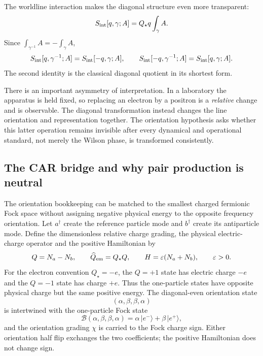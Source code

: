 \documentclass[11pt]{article}
\theoremstyle{definition}\newtheorem{definition}[theorem]{Definition}
\theoremstyle{remark}\newtheorem{remark}[theorem]{Remark}\newtheorem{conjecture}[theorem]{Conjecture}
\begin{document}
The worldline interaction makes the diagonal structure even more transparent:
\begin{equation}\label{eq:worldint}
 S_{\rm int}[q,\gamma;A]=Q_\star q\int_\gamma A.
\end{equation}
Since $\int_{\gamma^{-1}}A=-\int_\gamma A$,
\begin{equation}\label{eq:worlddiag}
 S_{\rm int}[q,\gamma^{-1};A]=S_{\rm int}[-q,\gamma;A],
 \qquad
 S_{\rm int}[-q,\gamma^{-1};A]=S_{\rm int}[q,\gamma;A].
\end{equation}
The second identity is the classical diagonal quotient in its shortest form.

There is an important asymmetry of interpretation. In a laboratory the apparatus is held fixed, so replacing an electron by a positron is a \emph{relative} change and is observable. The diagonal transformation instead changes the line orientation and representation together. The orientation hypothesis asks whether this latter operation remains invisible after every dynamical and operational standard, not merely the Wilson phase, is transformed consistently.

\subsection{The CAR bridge and why pair production is neutral}
The orientation bookkeeping can be matched to the smallest charged fermionic Fock space without assigning negative physical energy to the opposite frequency orientation. Let $a^\dagger$ create the reference particle mode and $b^\dagger$ create its antiparticle mode. Define the dimensionless relative charge grading, the physical electric-charge operator and the positive Hamiltonian by
\begin{equation}\label{eq:CARQH}
 Q=N_a-N_b,\qquad
 \widehat Q_{\rm em}=Q_\star Q,\qquad
 H=\varepsilon(N_a+N_b),\qquad \varepsilon>0.
\end{equation}
For the electron convention $Q_\star=-e$, the $Q=+1$ state has electric charge $-e$ and the $Q=-1$ state has charge $+e$. Thus the one-particle states have opposite physical charge but the same positive energy. The diagonal-even orientation state
\begin{equation}
 (\alpha,\beta,\beta,\alpha)
\end{equation}
is intertwined with the one-particle Fock state
\begin{equation}\label{eq:orientationCARbridge}
 \mathcal B(\alpha,\beta,\beta,\alpha)=\alpha\,|e^-\rangle+\beta\,|e^+\rangle,
\end{equation}
and the orientation grading $\chi$ is carried to the Fock charge sign. Either orientation half flip exchanges the two coefficients; the positive Hamiltonian does not change sign.
\end{document}
